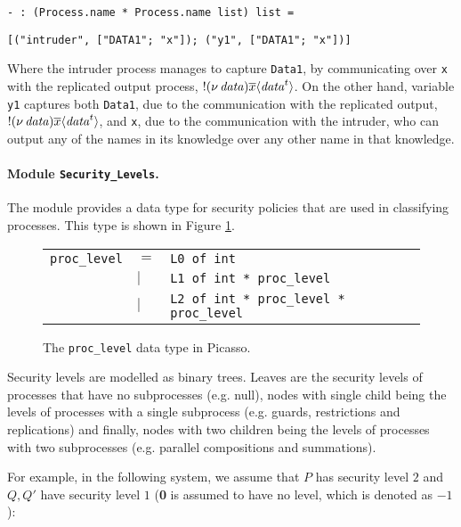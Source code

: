 \documentclass[10pt,a4paper,final,oneside,fleqn]{book}
\begin{document}
\noindent
\texttt{- : (Process.name * Process.name list) list =}

\noindent
\texttt{[("intruder", ["DATA1"; "x"]); ("y1", ["DATA1"; "x"])]}

\noindent
Where the intruder process manages to capture \texttt{Data1}, by communicating over \texttt{x} with the replicated output process, $!(\nu~\!\mbox{{\itshape data\/}})\overline{x}\langle\mbox{{\itshape data\/}}^t\rangle$.  On the other hand, variable \texttt{y1} captures both \texttt{Data1}, due to the communication with the replicated output, $!(\nu~\!\mbox{{\itshape data\/}})\overline{x}\langle\mbox{{\itshape data\/}}^t\rangle$, and \texttt{x}, due to the communication with the intruder, who can output any of the names in its knowledge over any other name in that knowledge.

\paragraph{Module \texttt{Security\_Levels}.} The module provides a data type for security policies that are used in classifying processes.  This type is shown in Figure \ref{proclevel}.
\begin{figure}[bht]
\begin{center}
\begin{tabular}{|lll|}
\hline
\texttt{proc\_level}&$=$&\texttt{L0 of int}\\
&$\mid$&\texttt{L1 of int * proc\_level}\\
&$\mid$&\texttt{L2 of int * proc\_level * proc\_level}\\

\hline
\end{tabular}
\end{center}
\caption{The \texttt{proc\_level} data type in Picasso.\label{proclevel}}
\end{figure}

\noindent
Security levels are modelled as binary trees.  Leaves are the security levels of processes that have no subprocesses (e.g. null), nodes with single child being the levels of processes with a single subprocess (e.g. guards, restrictions and replications) and finally, nodes with two children being the levels of processes with two subprocesses (e.g. parallel compositions and summations).

For example, in the following system, we assume that $P$ has security level $2$ and $Q,Q'$ have security level $1$ ({\bf 0} is assumed to have no level, which is denoted as $-1$):\vspace{6mm}
\end{document}
